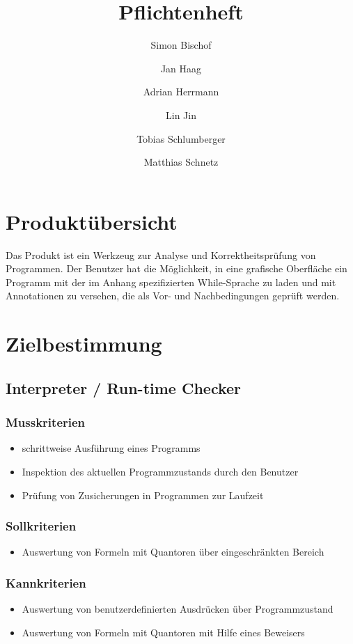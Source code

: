 \documentclass[a4paper,10pt]{article}
\title{Pflichtenheft}
\author{Simon Bischof \and Jan Haag \and Adrian Herrmann \and Lin Jin \and Tobias Schlumberger \and Matthias Schnetz}
\begin{document}
\maketitle
\newpage
\tableofcontents
\newpage

\section{Produktübersicht}

Das Produkt ist ein Werkzeug zur Analyse und Korrektheitsprüfung von Programmen. Der Benutzer hat die Möglichkeit, in eine grafische Oberfläche ein Programm mit der im Anhang spezifizierten While-Sprache zu laden und mit Annotationen zu versehen, die als Vor- und Nachbedingungen geprüft werden.

\section{Zielbestimmung}
\subsection{Interpreter / Run-time Checker}
\subsubsection{Musskriterien}
\begin{itemize}
  \item schrittweise Ausführung eines Programms
  \item Inspektion des aktuellen Programmzustands durch den Benutzer
  \item Prüfung von Zusicherungen in Programmen zur Laufzeit
\end{itemize}
\subsubsection{Sollkriterien}
\begin{itemize}
  \item Auswertung von Formeln mit Quantoren über eingeschränkten Bereich
\end{itemize}
\subsubsection{Kannkriterien}
\begin{itemize}
  \item Auswertung von benutzerdefinierten Ausdrücken über Programmzustand
  \item Auswertung von Formeln mit Quantoren mit Hilfe eines Beweisers
\end{itemize}
\end{document}
